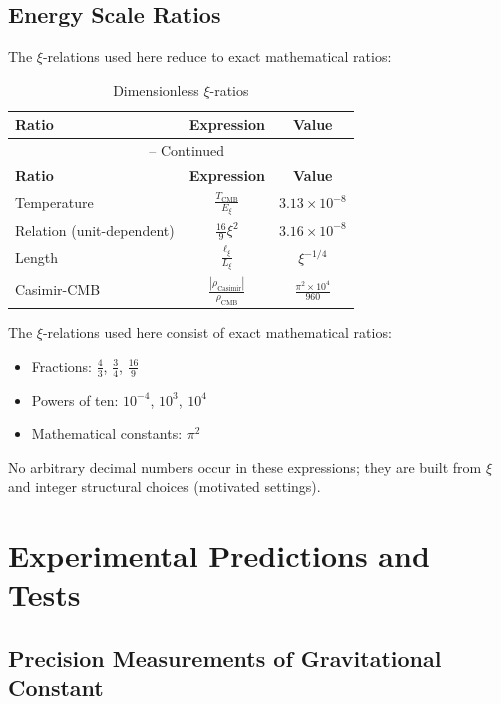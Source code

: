 	\subsection{Energy Scale Ratios}
	
	The $\xi$-relations used here reduce to exact mathematical ratios:
	
	\begin{longtable}{lcc}
		\caption{Dimensionless $\xi$-ratios} \\
		\toprule
		\textbf{Ratio} & \textbf{Expression} & \textbf{Value} \\
		\midrule
		\endfirsthead
		\multicolumn{3}{c}{\tablename\ \thetable{} -- Continued} \\
		\toprule
		\textbf{Ratio} & \textbf{Expression} & \textbf{Value} \\
		\midrule
		\endhead
		Temperature & $\frac{T_{\text{CMB}}}{E_\xi}$ & $3.13 \times 10^{-8}$ \\
		Relation (unit-dependent) & $\frac{16}{9}\xi^2$ & $3.16 \times 10^{-8}$ \\
		Length & $\frac{\ell_{\xi}}{L_\xi}$ & $\xi^{-1/4}$ \\
		Casimir-CMB & $\frac{|\rho_{\text{Casimir}}|}{\rho_{\text{CMB}}}$ & $\frac{\pi^2 \times 10^4}{960}$ \\
		\bottomrule
	\end{longtable}
\normalsize
	
	\begin{important}
		The $\xi$-relations used here consist of exact mathematical ratios:
		\begin{itemize}
			\item Fractions: $\frac{4}{3}$, $\frac{3}{4}$, $\frac{16}{9}$
			\item Powers of ten: $10^{-4}$, $10^3$, $10^4$
			\item Mathematical constants: $\pi^2$
		\end{itemize}
		No arbitrary decimal numbers occur in these expressions; they are built from $\xi$ and integer structural choices (motivated settings).
	\end{important}
	
	\section{Experimental Predictions and Tests}
	
	\subsection{Precision Measurements of Gravitational Constant}
	
